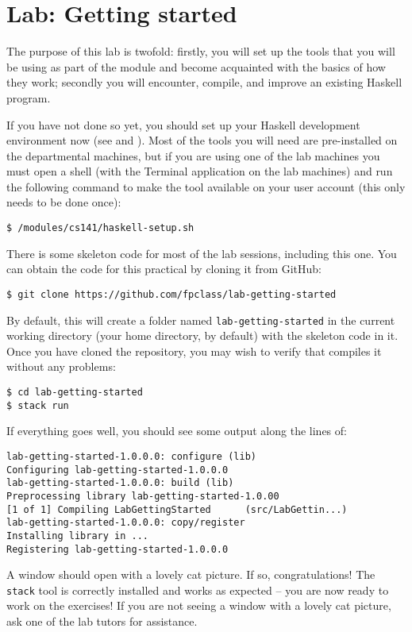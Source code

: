 \section{Lab: Getting started}

The purpose of this lab is twofold: firstly, you will set up the tools that you will be using as part of the module and become acquainted with the basics of how they work; secondly you will encounter, compile, and improve an existing Haskell program.


If you have not done so yet, you should set up your Haskell development environment now (see  and ). Most of the tools you will need are pre-installed on the departmental machines, but if you are using one of the lab machines you must open a shell (with the Terminal application on the lab machines) and run the following command to make the  tool available on your user account (this only needs to be done once):
\begin{verbatim}
$ /modules/cs141/haskell-setup.sh
\end{verbatim}

There is some skeleton code for most of the lab sessions, including this one. You can obtain the code for this practical by cloning it from GitHub:
\begin{verbatim}
$ git clone https://github.com/fpclass/lab-getting-started
\end{verbatim}
By default, this will create a folder named \texttt{\small lab-getting-started} in the current working directory (your home directory, by default) with the skeleton code in it. Once you have cloned the repository, you may wish to verify that  compiles it without any problems:
\begin{verbatim}
$ cd lab-getting-started
$ stack run
\end{verbatim}
If everything goes well, you should see some output along the lines of:
\begin{verbatim}
lab-getting-started-1.0.0.0: configure (lib)
Configuring lab-getting-started-1.0.0.0
lab-getting-started-1.0.0.0: build (lib)
Preprocessing library lab-getting-started-1.0.00
[1 of 1] Compiling LabGettingStarted      (src/LabGettin...)
lab-getting-started-1.0.0.0: copy/register
Installing library in ...
Registering lab-getting-started-1.0.0.0
\end{verbatim}
A window should open with a lovely cat picture. If so, congratulations! The \texttt{\small stack} tool is correctly installed and works as expected -- you are now ready to work on the exercises! If you are not seeing a window with a lovely cat picture, ask one of the lab tutors for assistance.

